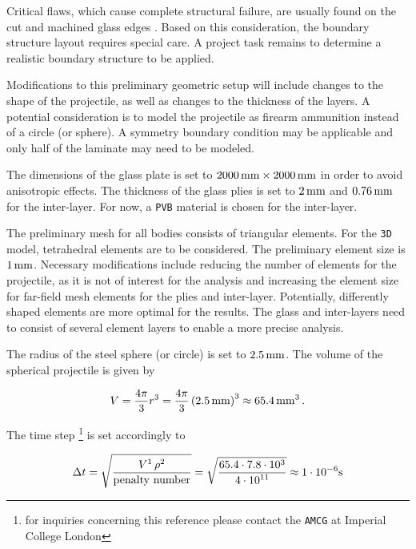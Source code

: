 \documentclass[12pt,twoside]{article}
\theoremstyle{break}
\begin{document}
\bigbreak
Critical flaws, which cause complete structural failure, are usually found on the cut and machined glass edges \cite{Pel16}. Based on this consideration, the boundary structure layout requires special care. A project task remains to determine a realistic boundary structure to be applied.

\bigbreak
Modifications to this preliminary geometric setup will include changes to the shape of the projectile, as well as changes to the thickness of the layers. A potential consideration is to model the projectile as firearm ammunition instead of a circle (or sphere). A symmetry boundary condition may be applicable and only half of the laminate may need to be modeled.

\bigbreak
The dimensions of the glass plate is set to $2000\,{\rm{mm}}\times2000\,{\rm{mm}}$ in order to avoid anisotropic effects. The thickness of the glass plies is set to $2\,{\rm{mm}}$ and $0.76\,{\rm{mm}}$ for the inter-layer. For now, a \texttt{PVB} material is chosen for the inter-layer.

\bigbreak
The preliminary mesh for all bodies consists of triangular elements. For the \texttt{3D} model, tetrahedral elements \cite{Che18} are to be considered. The preliminary element size is $1\,{\rm{mm}}$. Necessary modifications include reducing the number of elements for the projectile, as it is not of interest for the analysis and increasing the element size for far-field mesh elements for the plies and inter-layer. Potentially, differently shaped elements are more optimal for the results. The glass and inter-layers need to consist of several element layers to enable a more precise analysis. 

\bigbreak
The radius of the steel sphere (or circle) is set to $2.5\,{\rm{mm}}$. The volume of the spherical projectile is given by 

\begin{equation}
    V=\frac{4\pi}{3}r^3=\frac{4\pi}{3}\left(2.5\,{\rm{mm}}\right)^3\approx65.4\,{\rm{mm}}^3\,.
\end{equation}

The time step \cite{Far19}\footnote{\label{DEMPlus} for inquiries concerning this reference please contact the \texttt{AMCG} at Imperial College London} is set accordingly to

\begin{equation}
\Delta t=\sqrt{\frac{V\footnotemark\,\rho\footnotemark}{\rm{penalty\,\, number}}}=\sqrt{\frac{65.4\cdot7.8\cdot10^3}{4\cdot{10}^{11}}}\approx1\cdot{10}^{-6}{\rm{s}}
\end{equation}
\addtocounter{footnote}{-2}
\end{document}
